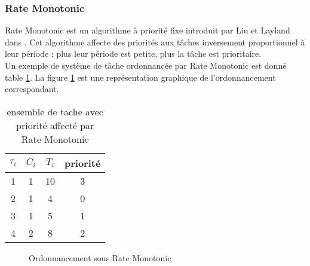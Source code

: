 \subsubsection{Rate Monotonic \cite{LL73}}
\vspace{-1cm}
Rate Monotonic est un algorithme à priorité fixe introduit par Liu et Layland dans \cite{LL73}. Cet algorithme affecte des priorités aux tâches inversement proportionnel à leur période : plus leur période est petite, plus la tâche est prioritaire. 
\\ \indent Un exemple de système de tâche ordonnancée par Rate Monotonic est donné table \ref{tab:exempleRM}. La figure \ref{fig:exempleRM} est une représentation graphique de l'ordonnancement correspondant.

\begin{table}[h]
\begin{center}
\begin{tabular}{|c|c|c|c|}
 \hline$\tau_i$ & $C_i$ & $T_i$ & priorité\\ 
 \hline1 & 1 & 10 & 3\\ 
 \hline2 & 1 & 4 & 0\\ 
 \hline3 & 1 & 5 & 1\\ 
 \hline4 & 2 & 8 & 2\\ 
 \hline
 \end{tabular}
\end{center}
\caption{ensemble de tache avec priorité affecté par Rate Monotonic} \label{tab:exempleRM}
\end{table}

\begin{figure}[h]
\begin{center}
\begin{RTGrid}[height=4cm,width=12cm,labelsize=8pt,numbersize=6]{4}{13}






\end{RTGrid}
\caption{Ordonnancement sous Rate Monotonic} \label{fig:exempleRM}
\end{center}
\end{figure}

